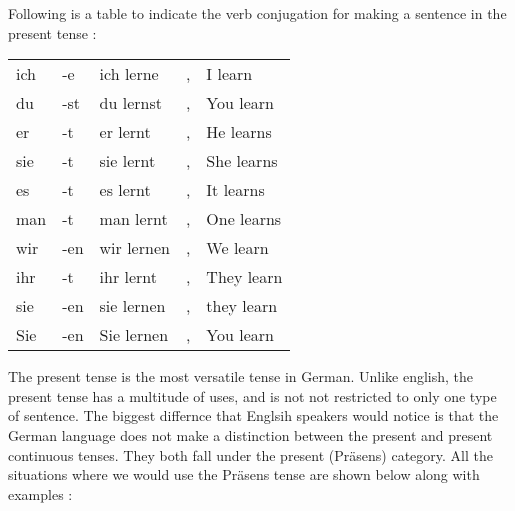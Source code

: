 \documentclass[a4paper,twocolumn,10pt]{article}
\newcommand{\newpar}
{\par \vspace{0.3cm}}
\newcommand{\tabularxtable}[3]
{

	\vspace{0.5cm}
	\nolinenumbers

	\begin{tabularx}{#1}{#2}
		#3
	\end{tabularx}

	\linenumbers
	\vspace{0.5cm}
}
\begin{document}
Following is a table to indicate the verb conjugation
for making a sentence in the present tense : \newpar


\tabularxtable
{0.95\linewidth}
{l|l|llX}
{
ich & -e  & ich lerne  & , & I learn\\
du  & -st & du lernst  & , & You learn\\
er  & -t  & er lernt   & , & He learns\\
sie & -t  & sie lernt  & , & She learns\\
es  & -t  & es lernt   & , & It learns\\
man & -t  & man lernt  & , & One learns\\
wir & -en & wir lernen & , & We learn\\
ihr & -t  & ihr lernt  & , & They learn\\
sie & -en & sie lernen & , & they learn\\
Sie & -en & Sie lernen & , & You learn\\
}


The present tense is the most versatile tense in German. Unlike english, the
present tense has a multitude of uses, and is not not restricted to only one
type of sentence. The biggest differnce that Englsih speakers would notice is
that the German language does not make a distinction between the present and
present continuous tenses. They both fall under the present (Präsens) category.
All the situations where we would use the Präsens tense are shown below along
with examples :\newpar
\end{document}
